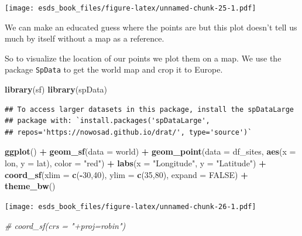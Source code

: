 \documentclass[
]{book}
\newenvironment{Shaded}{\begin{snugshade}}{\end{snugshade}}
\newcommand{\CommentTok}[1]{\textcolor[rgb]{0.56,0.35,0.01}{\textit{#1}}}
\newcommand{\DataTypeTok}[1]{\textcolor[rgb]{0.13,0.29,0.53}{#1}}
\newcommand{\DecValTok}[1]{\textcolor[rgb]{0.00,0.00,0.81}{#1}}
\newcommand{\KeywordTok}[1]{\textcolor[rgb]{0.13,0.29,0.53}{\textbf{#1}}}
\newcommand{\NormalTok}[1]{#1}
\newcommand{\OperatorTok}[1]{\textcolor[rgb]{0.81,0.36,0.00}{\textbf{#1}}}
\newcommand{\OtherTok}[1]{\textcolor[rgb]{0.56,0.35,0.01}{#1}}
\newcommand{\StringTok}[1]{\textcolor[rgb]{0.31,0.60,0.02}{#1}}
\begin{document}
\texttt{[image: esds\_book\_files/figure-latex/unnamed-chunk-25-1.pdf]}

We can make an educated guess where the points are but this plot doesn't tell us much by itself without a map as a reference.

So to visualize the location of our points we plot them on a map. We use the package \texttt{SpData} to get the world map and crop it to Europe.

\begin{Shaded}
\begin{Highlighting}[]
\KeywordTok{library}\NormalTok{(sf)}
\KeywordTok{library}\NormalTok{(spData)}
\end{Highlighting}
\end{Shaded}

\begin{verbatim}
## To access larger datasets in this package, install the spDataLarge
## package with: `install.packages('spDataLarge',
## repos='https://nowosad.github.io/drat/', type='source')`
\end{verbatim}

\begin{Shaded}
\begin{Highlighting}[]
\KeywordTok{ggplot}\NormalTok{() }\OperatorTok{+}
\StringTok{  }\KeywordTok{geom_sf}\NormalTok{(}\DataTypeTok{data =}\NormalTok{ world) }\OperatorTok{+}
\StringTok{  }\KeywordTok{geom_point}\NormalTok{(}\DataTypeTok{data =}\NormalTok{ df_sites, }\KeywordTok{aes}\NormalTok{(}\DataTypeTok{x =}\NormalTok{ lon, }\DataTypeTok{y =}\NormalTok{ lat), }\DataTypeTok{color =} \StringTok{"red"}\NormalTok{) }\OperatorTok{+}
\StringTok{  }\KeywordTok{labs}\NormalTok{(}\DataTypeTok{x =} \StringTok{"Longitude"}\NormalTok{, }\DataTypeTok{y =} \StringTok{"Latitude"}\NormalTok{) }\OperatorTok{+}
\StringTok{  }\KeywordTok{coord_sf}\NormalTok{(}\DataTypeTok{xlim =} \KeywordTok{c}\NormalTok{(}\OperatorTok{-}\DecValTok{30}\NormalTok{,}\DecValTok{40}\NormalTok{), }\DataTypeTok{ylim =} \KeywordTok{c}\NormalTok{(}\DecValTok{35}\NormalTok{,}\DecValTok{80}\NormalTok{), }\DataTypeTok{expand =} \OtherTok{FALSE}\NormalTok{) }\OperatorTok{+}
\StringTok{  }\KeywordTok{theme_bw}\NormalTok{()}
\end{Highlighting}
\end{Shaded}

\texttt{[image: esds\_book\_files/figure-latex/unnamed-chunk-26-1.pdf]}

\begin{Shaded}
\begin{Highlighting}[]
  \CommentTok{# coord_sf(crs = "+proj=robin")}
\end{Highlighting}
\end{Shaded}
\end{document}
